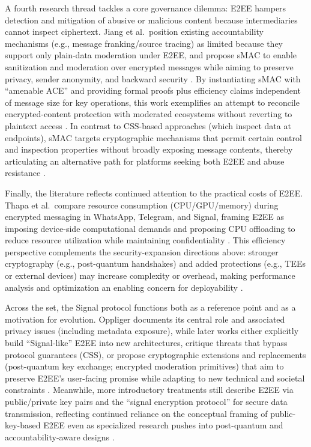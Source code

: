 A fourth research thread tackles a core governance dilemma: E2EE hampers detection and mitigation of abusive or malicious content because intermediaries cannot inspect ciphertext. Jiang et al.\ position existing accountability mechanisms (e.g., message franking/source tracing) as limited because they support only plain-data moderation under E2EE, and propose sMAC to enable sanitization and moderation over encrypted messages while aiming to preserve privacy, sender anonymity, and backward security \cite{jiang2024}. By instantiating sMAC with “amenable ACE” and providing formal proofs plus efficiency claims independent of message size for key operations, this work exemplifies an attempt to reconcile encrypted-content protection with moderated ecosystems without reverting to plaintext access \cite{jiang2024}. In contrast to CSS-based approaches (which inspect data at endpoints), sMAC targets cryptographic mechanisms that permit certain control and inspection properties without broadly exposing message contents, thereby articulating an alternative path for platforms seeking both E2EE and abuse resistance \cite{jiang2024,alsop2025}.

Finally, the literature reflects continued attention to the practical costs of E2EE. Thapa et al.\ compare resource consumption (CPU/GPU/memory) during encrypted messaging in WhatsApp, Telegram, and Signal, framing E2EE as imposing device-side computational demands and proposing CPU offloading to reduce resource utilization while maintaining confidentiality \cite{thapa2025}. This efficiency perspective complements the security-expansion directions above: stronger cryptography (e.g., post-quantum handshakes) and added protections (e.g., TEEs or external devices) may increase complexity or overhead, making performance analysis and optimization an enabling concern for deployability \cite{thapa2025,r2025,alsop2025}.

Across the set, the Signal protocol functions both as a reference point and as a motivation for evolution. Oppliger documents its central role and associated privacy issues (including metadata exposure), while later works either explicitly build “Signal-like” E2EE into new architectures, critique threats that bypass protocol guarantees (CSS), or propose cryptographic extensions and replacements (post-quantum key exchange; encrypted moderation primitives) that aim to preserve E2EE’s user-facing promise while adapting to new technical and societal constraints \cite{oppliger2020,kanimozhi2025,alsop2025,sharma2023,jiang2024}. Meanwhile, more introductory treatments still describe E2EE via public/private key pairs and the “signal encryption protocol” for secure data transmission, reflecting continued reliance on the conceptual framing of public-key-based E2EE even as specialized research pushes into post-quantum and accountability-aware designs \cite{p2023}.

